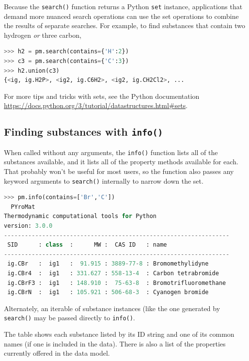 Because the \texttt{search()} function returns a Python \texttt{set} instance, applications that demand more nuanced search operations can use the set operations to combine the results of separate searches.  For example, to find substances that contain two hydrogen \emph{or} three carbon,
\begin{lstlisting}[language=Python]
>>> h2 = pm.search(contains={'H':2})
>>> c3 = pm.search(contains={'C':3})
>>> h2.union(c3)
{<ig, ig.H2P>, <ig2, ig.C6H2>, <ig2, ig.CH2Cl2>, ...
\end{lstlisting}
For more tips and tricks with sets, see the Python documentation \url{https://docs.python.org/3/tutorial/datastructures.html#sets}.

\subsection{Finding substances with \texttt{info()}}

When called without any arguments, the \texttt{info()} function lists all of the substances available, and it lists all of the property methods available for each.  That probably won't be useful for most users, so the function also passes any keyword arguments to \texttt{search()} internally to narrow down the set.
\begin{lstlisting}[language=Python,style=tinystyle]
>>> pm.info(contains=['Br','C'])
  PYroMat
Thermodynamic computational tools for Python
version: 3.0.0
-----------------------------------------------------------------
 SID      : class  :      MW :  CAS ID   : name                 
-----------------------------------------------------------------
 ig.CBr   :  ig1   :  91.915 : 3889-77-8 : Bromomethylidyne     
 ig.CBr4  :  ig1   : 331.627 : 558-13-4  : Carbon tetrabromide  
 ig.CBrF3 :  ig1   : 148.910 :  75-63-8  : Bromotrifluoromethane
 ig.CBrN  :  ig1   : 105.921 : 506-68-3  : Cyanogen bromide  
\end{lstlisting}

Alternately, an iterable of substance instances (like the one generated by \texttt{search()} may be passed directly to \texttt{info()}.  

The table shows each substance listed by its ID string and one of its common names (if one is included in the data).  There is also a list of the properties currently offered in the data model.

